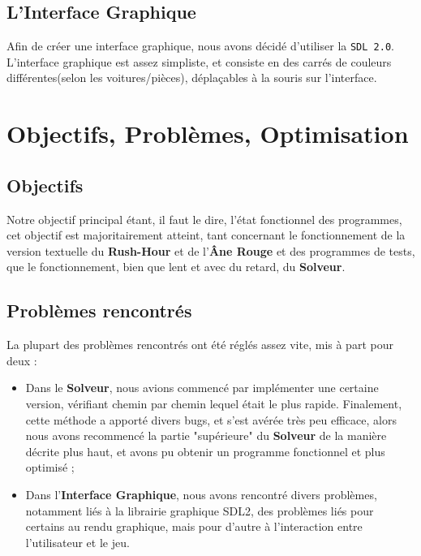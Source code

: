 \documentclass[12pt]{article}
\begin{document}
\subsection{L'Interface Graphique}
Afin de créer une interface graphique, nous avons décidé d'utiliser la \texttt{SDL 2.0}.
L'interface graphique est assez simpliste, et consiste en des carrés de couleurs différentes(selon les voitures/pièces), déplaçables à la souris sur l'interface.

\section{Objectifs, Problèmes, Optimisation}
\subsection{Objectifs}
Notre objectif principal étant, il faut le dire, l'état fonctionnel des programmes, cet objectif est majoritairement atteint, tant concernant le fonctionnement de la version textuelle du \textbf{Rush-Hour} et de l'\textbf{Âne Rouge} et des programmes de tests, que le fonctionnement, bien que lent et avec du retard, du \textbf{Solveur}.

\subsection{Problèmes rencontrés}
La plupart des problèmes rencontrés ont été réglés assez vite, mis à part pour deux :
\begin{itemize}
\item Dans le \textbf{Solveur}, nous avions commencé par implémenter une certaine version, vérifiant chemin par chemin lequel était le plus rapide. Finalement, cette méthode a apporté divers bugs, et s'est avérée très peu efficace, alors nous avons recommencé la partie "supérieure" du \textbf{Solveur} de la manière décrite plus haut, et avons pu obtenir un programme fonctionnel et plus optimisé ;
\item Dans l'\textbf{Interface Graphique}, nous avons rencontré divers problèmes, notamment liés à la librairie graphique SDL2, des problèmes liés pour certains au rendu graphique, mais pour d'autre à l'interaction entre l'utilisateur et le jeu.
\end{itemize}
\end{document}
